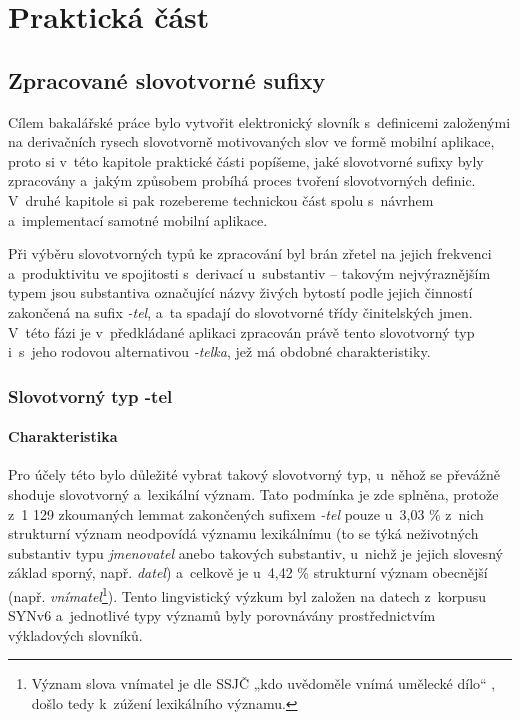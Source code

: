 \part{Praktická část}

\hypertarget{zpracovanuxe9-slovotvornuxe9-sufixy}{%
\chapter{Zpracované slovotvorné
sufixy}\label{zpracovanuxe9-slovotvornuxe9-sufixy}}

Cílem bakalářské práce bylo vytvořit elektronický slovník s~definicemi
založenými na derivačních rysech slovotvorně motivovaných slov ve formě
mobilní aplikace, proto si v~této kapitole praktické části popíšeme,
jaké slovotvorné sufixy byly zpracovány a~jakým způsobem probíhá proces
tvoření slovotvorných definic. V~druhé kapitole si pak rozebereme
technickou část spolu s~návrhem a~implementací samotné mobilní aplikace.

Při výběru slovotvorných typů ke zpracování byl brán zřetel na jejich
frekvenci a~produktivitu ve spojitosti s~derivací u~substantiv --
takovým nejvýraznějším typem jsou substantiva označující názvy živých
bytostí podle jejich činností zakončená na sufix \emph{-tel}, a~ta
spadají do slovotvorné třídy činitelských jmen.
\parencite[17]{dokulil67} V~této fázi je v~předkládané aplikaci
zpracován právě tento slovotvorný typ i~s~jeho rodovou alternativou
\emph{-telka}, jež má obdobné charakteristiky.

\hypertarget{slovotvornuxfd-typ--tel}{%
\section{Slovotvorný typ -tel}\label{slovotvornuxfd-typ--tel}}

\hypertarget{charakteristika}{%
\subsection{Charakteristika}\label{charakteristika}}

Pro účely této bylo důležité vybrat takový slovotvorný typ, u~něhož se
převážně shoduje slovotvorný a~lexikální význam. Tato podmínka je zde
splněna, protože z~1 129 zkoumaných lemmat zakončených sufixem
\emph{-tel} pouze u~3,03 \% z~nich strukturní význam neodpovídá významu
lexikálnímu (to se týká neživotných substantiv typu \emph{jmenovatel}
anebo takových substantiv, u~nichž je jejich slovesný základ sporný,
např. \emph{datel}) a~celkově je u~4,42 \% strukturní význam obecnější
(např.
\emph{vnímatel}\footnote{Význam slova vnímatel je dle SSJČ „kdo uvědoměle vnímá umělecké dílo“ \parencite{ssjc}, došlo tedy k~zúžení lexikálního významu.}).
Tento lingvistický výzkum byl založen na datech z~korpusu SYNv6
a~jednotlivé typy významů byly porovnávány prostřednictvím výkladových
slovníků. \parencite{adri}

